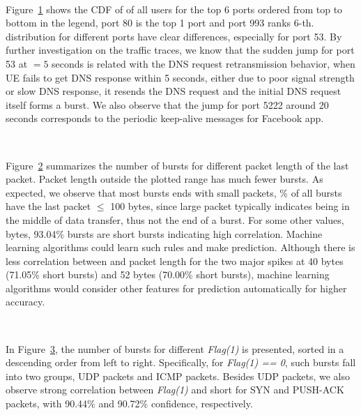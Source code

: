 \begin{figure}[t]
\centering
{} \\
\label{fig:port1}
\end{figure}
Figure~\ref{fig:port1} shows the CDF of \IBTS of all users for the top 6 ports ordered from top to bottom in the legend, \ie port 80 is the top 1 port and port 993 ranks 6-th. \IBT distribution for different ports have clear differences, especially for port 53. By further investigation on the traffic traces, we know that the sudden jump for port 53 at \IBT $=5$ seconds is related with the DNS request retransmission behavior, \ie when UE fails to get DNS response within 5 seconds, either due to poor signal strength or slow DNS response, it resends the DNS request and the initial DNS request itself forms a burst. We also observe that the jump for port 5222 around 20 seconds corresponds to the periodic keep-alive messages for Facebook app.

\begin{figure}[t]
\centering
{} \\
\label{fig:len1}
\end{figure}

Figure~\ref{fig:len1} summarizes the number of bursts for different packet length of the last packet. Packet length outside the plotted range has much fewer bursts. As expected, we observe that most bursts ends with small packets, \% of all bursts have the last packet $\leq$ 100 bytes, since large packet typically indicates being in the middle of data transfer, thus not the end of a burst. For some other values,  bytes, 93.04\% bursts are short bursts indicating high correlation. Machine learning algorithms could learn such rules and make prediction. Although there is less correlation between \IBT and packet length for the two major spikes at 40 bytes (71.05\% short bursts) and 52 bytes (70.00\% short bursts), machine learning algorithms would consider other features for prediction automatically for higher accuracy.

\begin{figure}[t]
\centering
{} \\
\label{fig:flag1.bar}
\end{figure}

In Figure~\ref{fig:flag1.bar}, the number of bursts for different {\em Flag(1)} is presented, sorted in a descending order from left to right. Specifically, for {\em Flag(1) == 0}, such bursts fall into two groups, UDP packets and ICMP packets. Besides UDP packets, we also observe strong correlation between {\em Flag(1)} and short \IBTS for SYN and PUSH-ACK packets, with 90.44\% and 90.72\% confidence, respectively.

